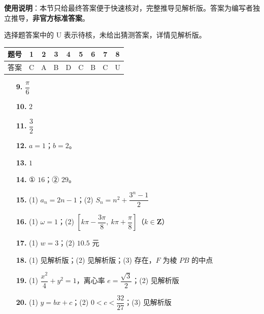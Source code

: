 
\begin{gknotice}
\textbf{使用说明}：本节只给最终答案便于快速核对，完整推导见解析版。答案为编写者独立推导，\textbf{非官方标准答案}。
\end{gknotice}

\begin{gknotice}
选择题答案中的 U 表示待核，未给出猜测答案，详情见解析版。
\end{gknotice}

\begin{center}\begin{tabular}{ccccccccc}
\toprule
题号 & 1 & 2 & 3 & 4 & 5 & 6 & 7 & 8 \\
\midrule
答案 & C & A & B & D & C & B & C & U \\
\bottomrule
\end{tabular}\end{center}

\begin{itemize}[leftmargin=2.6em]
  \item[\textbf{9.}] \(\dfrac{\pi}{6}\)
  \item[\textbf{10.}] \(2\)
  \item[\textbf{11.}] \(\dfrac{3}{2}\)
  \item[\textbf{12.}] \(a=1\)；\(b=2\)。
  \item[\textbf{13.}] \(1\)
  \item[\textbf{14.}] ① \(16\)；② \(29\)。
\end{itemize}

\begin{itemize}[leftmargin=2.6em]
  \item[\textbf{15.}] (1) \(a_n=2n-1\)；(2) \(S_n=n^{2}+\dfrac{3^{n}-1}{2}\)
  \item[\textbf{16.}] (1) \(\omega=1\)；(2) \(\left[k\pi-\dfrac{3\pi}{8},\ k\pi+\dfrac{\pi}{8}\right]\)（\(k\in\mathbf{Z}\)）
  \item[\textbf{17.}] (1) \(w=3\)；(2) \(10.5\) 元
  \item[\textbf{18.}] (1) 见解析版；(2) 见解析版；(3) 存在，\(F\) 为棱 \(PB\) 的中点
  \item[\textbf{19.}] (1) \(\dfrac{x^{2}}{4}+y^{2}=1\)，离心率 \(e=\dfrac{\sqrt{3}}{2}\)；(2) 见解析版
  \item[\textbf{20.}] (1) \(y=bx+c\)；(2) \(0<c<\dfrac{32}{27}\)；(3) 见解析版
\end{itemize}
